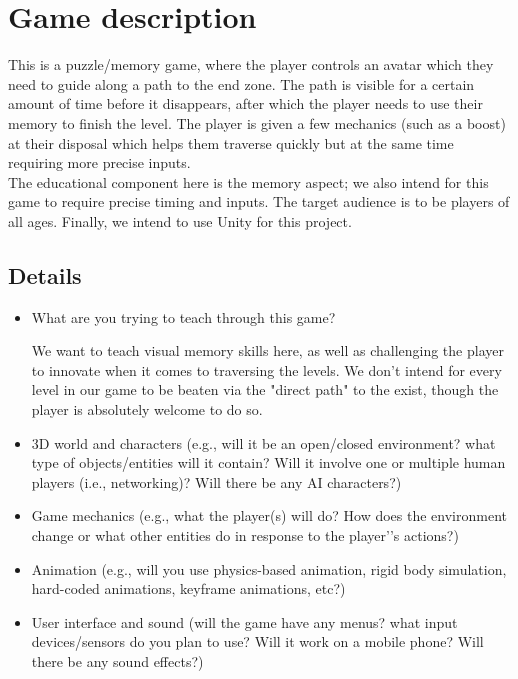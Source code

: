 \documentclass[11pt]{article}
\begin{document}
\maketitle

\section{Game description}


This is a puzzle/memory game, where the player controls an avatar which they need to guide along a path to the end zone. The path is visible for a certain amount of time before it disappears, after which the player needs to use their memory to finish the level. The player is given a few mechanics (such as a boost) at their disposal which helps them traverse quickly but at the same time requiring more precise inputs.\\

The educational component here is the memory aspect; we also intend for this game to require precise timing and inputs. The target audience is to be players of all ages. Finally, we intend to use Unity for this project.

\subsection{Details}
\begin{itemize}
\item What are you trying to teach through this game?

We want to teach visual memory skills here, as well as challenging the player to innovate when it comes to traversing the levels. We don't intend for every level in our game to be beaten via the "direct path" to the exist, though the player is absolutely welcome to do so.

\item 3D world and characters (e.g., will it be an open/closed environment? what type of objects/entities will it contain? Will it involve one or multiple human players (i.e., networking)? Will there be any AI characters?)

\item Game mechanics (e.g., what the player(s) will do? How does the environment change or what other entities do in response to the player’'s actions?)

\item Animation (e.g., will you use physics-based animation, rigid body simulation, hard-coded animations, keyframe animations, etc?)
\item User interface and sound (will the game have any menus? what input devices/sensors do you plan to use? Will it work on a mobile phone? Will there be any sound effects?)
\end{itemize}
\end{document}
